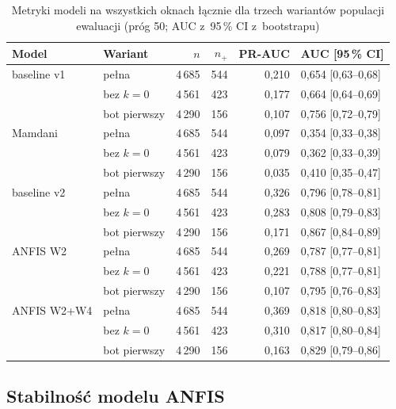 \begin{table}[H]\centering\footnotesize\setlength{\tabcolsep}{4pt}
\caption{Metryki modeli na wszystkich oknach łącznie dla trzech wariantów populacji ewaluacji
  (próg 50; AUC z~95\,\% CI z~bootstrapu)}\label{tab:sensitivity}
\begin{tabular}{llrrrl}
\toprule
Model & Wariant & $n$ & $n_+$ & PR-AUC & AUC [95\,\% CI] \\
\midrule
baseline v1   & pełna        & 4\,685 & 544 & 0{,}210 & 0{,}654 [0{,}63--0{,}68] \\
              & bez $k=0$    & 4\,561 & 423 & 0{,}177 & 0{,}664 [0{,}64--0{,}69] \\
              & bot pierwszy & 4\,290 & 156 & 0{,}107 & 0{,}756 [0{,}72--0{,}79] \\
\midrule
Mamdani       & pełna        & 4\,685 & 544 & 0{,}097 & 0{,}354 [0{,}33--0{,}38] \\
              & bez $k=0$    & 4\,561 & 423 & 0{,}079 & 0{,}362 [0{,}33--0{,}39] \\
              & bot pierwszy & 4\,290 & 156 & 0{,}035 & 0{,}410 [0{,}35--0{,}47] \\
\midrule
baseline v2   & pełna        & 4\,685 & 544 & 0{,}326 & 0{,}796 [0{,}78--0{,}81] \\
              & bez $k=0$    & 4\,561 & 423 & 0{,}283 & 0{,}808 [0{,}79--0{,}83] \\
              & bot pierwszy & 4\,290 & 156 & 0{,}171 & 0{,}867 [0{,}84--0{,}89] \\
\midrule
ANFIS W2      & pełna        & 4\,685 & 544 & 0{,}269 & 0{,}787 [0{,}77--0{,}81] \\
              & bez $k=0$    & 4\,561 & 423 & 0{,}221 & 0{,}788 [0{,}77--0{,}81] \\
              & bot pierwszy & 4\,290 & 156 & 0{,}107 & 0{,}795 [0{,}76--0{,}83] \\
\midrule
ANFIS W2+W4   & pełna        & 4\,685 & 544 & 0{,}369 & 0{,}818 [0{,}80--0{,}83] \\
              & bez $k=0$    & 4\,561 & 423 & 0{,}310 & 0{,}817 [0{,}80--0{,}84] \\
              & bot pierwszy & 4\,290 & 156 & 0{,}163 & 0{,}829 [0{,}79--0{,}86] \\
\bottomrule
\end{tabular}
\end{table}

\subsection{Stabilność modelu ANFIS}

